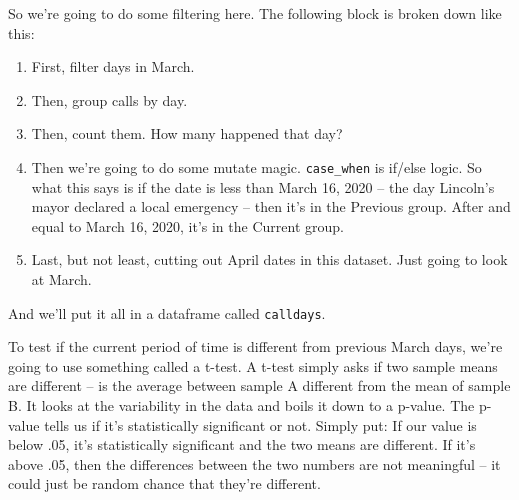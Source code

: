 \documentclass[]{book}
\newenvironment{Shaded}{\begin{snugshade}}{\end{snugshade}}
\newcommand{\DataTypeTok}[1]{\textcolor[rgb]{0.13,0.29,0.53}{#1}}
\newcommand{\DecValTok}[1]{\textcolor[rgb]{0.00,0.00,0.81}{#1}}
\newcommand{\KeywordTok}[1]{\textcolor[rgb]{0.13,0.29,0.53}{\textbf{#1}}}
\newcommand{\NormalTok}[1]{#1}
\newcommand{\OperatorTok}[1]{\textcolor[rgb]{0.81,0.36,0.00}{\textbf{#1}}}
\newcommand{\StringTok}[1]{\textcolor[rgb]{0.31,0.60,0.02}{#1}}
\providecommand{\tightlist}{%
  \setlength{\itemsep}{0pt}\setlength{\parskip}{0pt}}
\begin{document}
So we're going to do some filtering here. The following block is broken down like this:

\begin{enumerate}
\def\labelenumi{\arabic{enumi}.}
\tightlist
\item
  First, filter days in March.
\item
  Then, group calls by day.
\item
  Then, count them. How many happened that day?
\item
  Then we're going to do some mutate magic. \texttt{case\_when} is if/else logic. So what this says is if the date is less than March 16, 2020 -- the day Lincoln's mayor declared a local emergency -- then it's in the Previous group. After and equal to March 16, 2020, it's in the Current group.
\item
  Last, but not least, cutting out April dates in this dataset. Just going to look at March.
\end{enumerate}

And we'll put it all in a dataframe called \texttt{calldays}.

\begin{Shaded}
\end{Shaded}

To test if the current period of time is different from previous March days, we're going to use something called a t-test. A t-test simply asks if two sample means are different -- is the average between sample A different from the mean of sample B. It looks at the variability in the data and boils it down to a p-value. The p-value tells us if it's statistically significant or not. Simply put: If our value is below .05, it's statistically significant and the two means are different. If it's above .05, then the differences between the two numbers are not meaningful -- it could just be random chance that they're different.
\end{document}
